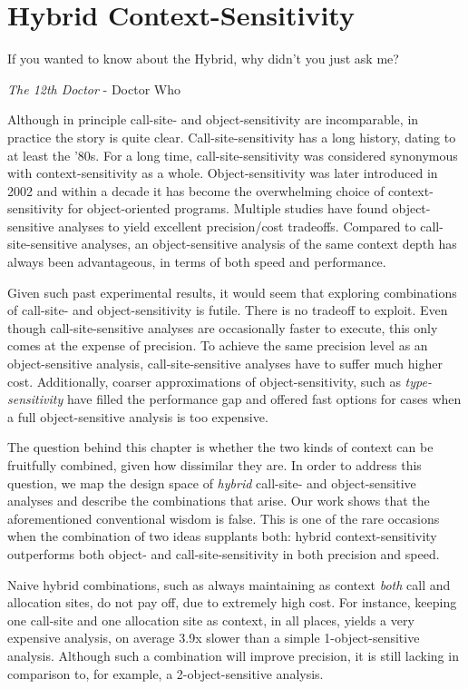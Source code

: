\chapter{Hybrid Context-Sensitivity}
\label{chapter:hybrid}
\epigraph{If you wanted to know about the Hybrid, why didn’t you just ask me?}{\textit{The 12th Doctor} - Doctor Who}

Although in principle call-site- and object-sensitivity are incomparable, in practice the story is quite clear. Call-site-sensitivity has a long history, dating to at least the '80s. For a long time, call-site-sensitivity was considered synonymous with context-sensitivity as a whole. Object-sensitivity was later introduced in 2002 \cite{issta:2002:Milanova} and within a decade it has become the overwhelming choice of context-sensitivity for object-oriented programs. Multiple studies \cite{pldi:2006:Naik,paste:2005:Liang,thesis:Lhotak,article:2008:tosem:Lhotak,oopsla:2009:Bravenboer} have found object-sensitive analyses to yield excellent precision/cost tradeoffs. Compared to call-site-sensitive analyses, an object-sensitive analysis of the same context depth has always been advantageous, in terms of both speed and performance.

Given such past experimental results, it would seem that exploring combinations of call-site- and object-sensitivity is futile. There is no tradeoff to exploit. Even though call-site-sensitive analyses are occasionally faster to execute, this only comes at the expense of precision. To achieve the same precision level as an object-sensitive analysis, call-site-sensitive analyses have to suffer much higher cost. Additionally, coarser approximations of object-sensitivity, such as \emph{type-sensitivity} \cite{popl:2011:Smaragdakis} have filled the performance gap and offered fast options for cases when a full object-sensitive analysis is too expensive.

The question behind this chapter is whether the two kinds of context can be fruitfully combined, given how dissimilar they are. In order to address this question, we map the design space of \emph{hybrid} call-site- and object-sensitive analyses and describe the combinations that arise. Our work shows that the aforementioned conventional wisdom is false. This is one of the rare occasions when the combination of two ideas supplants both: hybrid context-sensitivity outperforms both object- and call-site-sensitivity in both precision and speed.

Naive hybrid combinations, such as always maintaining as context \emph{both} call and allocation sites, do not pay off, due to extremely high cost. For instance, keeping one call-site and one allocation site as context, in all places, yields a very expensive analysis, on average 3.9x slower than a simple 1-object-sensitive analysis. Although such a combination will improve precision, it is still lacking in comparison to, for example, a 2-object-sensitive analysis.

